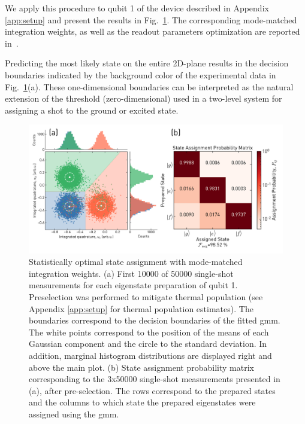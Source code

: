 We apply this procedure to qubit 1 of the device described in Appendix \ref{app:setup} and present the results in Fig.~\ref{fig:ssro_opt}. The corresponding mode-matched integration weights, as well as the readout parameters optimization are reported in~\cite[Appendix B]{Lacroix2019}.

Predicting the most likely state on the entire 2D-plane results in the decision boundaries indicated by the background color of the experimental data in Fig.~\ref{fig:ssro_opt}(a). These one-dimensional boundaries can be interpreted as the natural extension of the threshold (zero-dimensional) used in a two-level system for assigning a shot to the ground or excited state. 

\begin{figure}[t]
  \centering
    \includegraphics[width=\textwidth]{appendices/qutrit_readout/figs/ch3_readout_GMM_scatter_and_hist_20200116_144401_combined.png}
   \caption{Statistically optimal state assignment with mode-matched integration weights. (a) First 10000 of 50000 single-shot measurements for each eigenstate preparation of qubit 1. Preselection was performed to mitigate thermal population (see Appendix \ref{app:setup} for thermal population estimates). The boundaries correspond to the decision boundaries of the fitted \gls{gmm}. The white points correspond to the position of the means of each Gaussian component and the circle to the standard deviation. In addition, marginal histogram distributions are displayed right and above the main plot. (b) State assignment probability matrix corresponding to the 3x50000 single-shot measurements presented in (a), after pre-selection. The rows correspond to the prepared states and the columns to which state the prepared eigenstates were assigned using the \gls{gmm}.}
  \label{fig:ssro_opt}
\end{figure}

